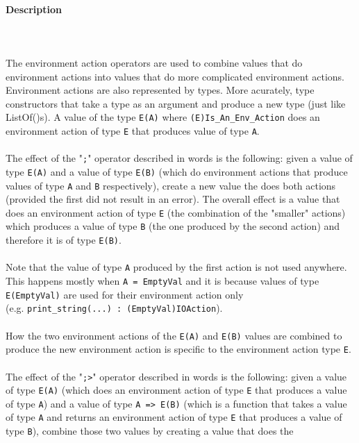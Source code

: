\documentclass{article}
\begin{document}
\paragraph{Description}\mbox{} \\\\
The environment action operators are used to combine values that do environment
actions into values that do more complicated environment actions. Environment
actions are also represented by types. More acurately, type constructors that
take a type as an argument and produce a new type (just like ListOf()s). A
value of the type \texttt{E(A)} where \texttt{(E)Is_An_Env_Action} does an
environment action of type \texttt{E} that produces value of type \texttt{A}.
\\\\
The effect of the "\texttt{;}" operator described in words is the following:
given a value of type \texttt{E(A)} and a value of type \texttt{E(B)} (which
do environment actions that produce values of type \texttt{A} and \texttt{B}
respectively), create a new value the does both actions (provided the first did
not result in an error).  The overall effect is a value that does an
environment action of type \texttt{E} (the combination of the "smaller"
actions) which produces a value of type \texttt{B} (the one produced by the second
action) and therefore it is of type \texttt{E(B)}.
\\\\
Note that the value of type \texttt{A} produced by the first action is not used
anywhere. This happens mostly when \texttt{A = EmptyVal} and it is 
because values of type \texttt{E(EmptyVal)} are used for their environment
action only \\(e.g. \texttt{print_string(...)\ :\ (EmptyVal)IOAction}).
\\\\
How the two environment actions of the \texttt{E(A)} and \texttt{E(B)} values
are combined to produce the new environment action is specific to the
environment action type \texttt{E}.
\\\\
The effect of the "\texttt{;>}" operator described in words is the following:
given a value of type \texttt{E(A)} (which does an environment action of type
\texttt{E} that produces a value of type \texttt{A}) and a value of type
\texttt{A => E(B)} (which is a function that takes a value of type \texttt{A}
and returns an environment action of type \texttt{E} that produces a value
of type \texttt{B}), combine those two values by creating a value that does the
\end{document}

